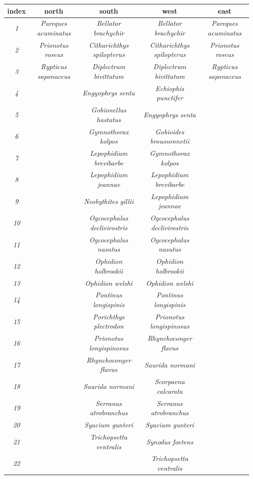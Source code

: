 \documentclass[
  letterpaper,
  DIV=11,
  numbers=noendperiod]{scrartcl}
\begin{document}
\begingroup\fontsize{9.5}{11.5}\selectfont

\begin{longtable*}[t]{ccccc}
\toprule
index & north & south & west & east\\
\midrule
\em{1} & \em{Pareques acuminatus} & \em{Bellator brachychir} & \em{Bellator brachychir} & \em{Pareques acuminatus}\\
\em{2} & \em{Prionotus roseus} & \em{Citharichthys spilopterus} & \em{Citharichthys spilopterus} & \em{Prionotus roseus}\\
\em{3} & \em{Rypticus saponaceus} & \em{Diplectrum bivittatum} & \em{Diplectrum bivittatum} & \em{Rypticus saponaceus}\\
\em{4} & \em{} & \em{Engyophrys senta} & \em{Echiophis punctifer} & \em{}\\
\em{5} & \em{} & \em{Gobionellus hastatus} & \em{Engyophrys senta} & \em{}\\
\addlinespace
\em{6} & \em{} & \em{Gymnothorax kolpos} & \em{Gobioides broussonnetii} & \em{}\\
\em{7} & \em{} & \em{Lepophidium brevibarbe} & \em{Gymnothorax kolpos} & \em{}\\
\em{8} & \em{} & \em{Lepophidium jeannae} & \em{Lepophidium brevibarbe} & \em{}\\
\em{9} & \em{} & \em{Neobythites gillii} & \em{Lepophidium jeannae} & \em{}\\
\em{10} & \em{} & \em{Ogcocephalus declivirostris} & \em{Ogcocephalus declivirostris} & \em{}\\
\addlinespace
\em{11} & \em{} & \em{Ogcocephalus nasutus} & \em{Ogcocephalus nasutus} & \em{}\\
\em{12} & \em{} & \em{Ophidion holbrookii} & \em{Ophidion holbrookii} & \em{}\\
\em{13} & \em{} & \em{Ophidion welshi} & \em{Ophidion welshi} & \em{}\\
\em{14} & \em{} & \em{Pontinus longispinis} & \em{Pontinus longispinis} & \em{}\\
\em{15} & \em{} & \em{Porichthys plectrodon} & \em{Prionotus longispinosus} & \em{}\\
\addlinespace
\em{16} & \em{} & \em{Prionotus longispinosus} & \em{Rhynchoconger flavus} & \em{}\\
\em{17} & \em{} & \em{Rhynchoconger flavus} & \em{Saurida normani} & \em{}\\
\em{18} & \em{} & \em{Saurida normani} & \em{Scorpaena calcarata} & \em{}\\
\em{19} & \em{} & \em{Serranus atrobranchus} & \em{Serranus atrobranchus} & \em{}\\
\em{20} & \em{} & \em{Syacium gunteri} & \em{Syacium gunteri} & \em{}\\
\addlinespace
\em{21} & \em{} & \em{Trichopsetta ventralis} & \em{Synodus foetens} & \em{}\\
\em{22} & \em{} & \em{} & \em{Trichopsetta ventralis} & \em{}\\
\bottomrule
\end{longtable*}
\endgroup{}
\end{document}

